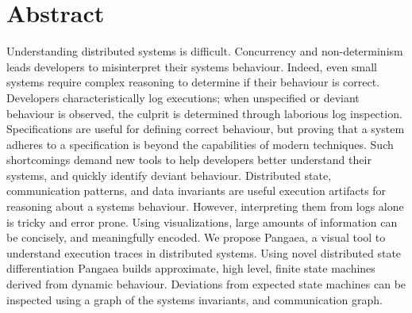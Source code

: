 
\section{Abstract}
\label{sec:abstract}


Understanding distributed systems is difficult. Concurrency and
non-determinism leads developers to misinterpret their systems
behaviour. Indeed, even small systems require complex reasoning to
determine if their behaviour is correct.  Developers
characteristically log executions; when unspecified or deviant
behaviour is observed, the culprit is determined through laborious log
inspection. Specifications are useful for defining correct behaviour,
but proving that a system adheres to a specification is beyond the
capabilities of modern techniques.  Such shortcomings demand new tools
to help developers better understand their systems, and quickly
identify deviant behaviour.  
Distributed
state, communication patterns, and data invariants are useful
execution artifacts for reasoning about a systems behaviour.  However,
interpreting them from logs alone is tricky and error prone.  
Using visualizations, large amounts of
information can be concisely, and meaningfully encoded. 
We propose Pangaea, a visual tool to understand execution traces in
distributed systems.  
Using novel distributed state differentiation
Pangaea builds approximate, high level, finite state machines derived
from dynamic behaviour. Deviations from expected state machines can be
inspected using a graph of the systems invariants, and communication
graph. 
